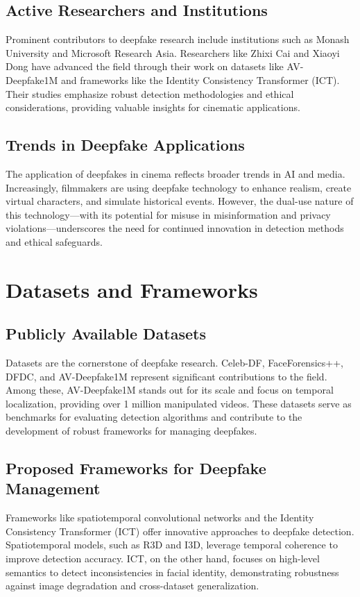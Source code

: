 \documentclass[12pt]{article}
\begin{document}
\subsection{Active Researchers and Institutions}
Prominent contributors to deepfake research include institutions such as Monash University and Microsoft Research Asia. Researchers like Zhixi Cai and Xiaoyi Dong have advanced the field through their work on datasets like AV-Deepfake1M and frameworks like the Identity Consistency Transformer (ICT). Their studies emphasize robust detection methodologies and ethical considerations, providing valuable insights for cinematic applications.

\subsection{Trends in Deepfake Applications}
The application of deepfakes in cinema reflects broader trends in AI and media. Increasingly, filmmakers are using deepfake technology to enhance realism, create virtual characters, and simulate historical events. However, the dual-use nature of this technology—with its potential for misuse in misinformation and privacy violations—underscores the need for continued innovation in detection methods and ethical safeguards.

\section{Datasets and Frameworks}
\subsection{Publicly Available Datasets}
Datasets are the cornerstone of deepfake research. Celeb-DF, FaceForensics++, DFDC, and AV-Deepfake1M represent significant contributions to the field. Among these, AV-Deepfake1M stands out for its scale and focus on temporal localization, providing over 1 million manipulated videos. These datasets serve as benchmarks for evaluating detection algorithms and contribute to the development of robust frameworks for managing deepfakes.

\subsection{Proposed Frameworks for Deepfake Management}
Frameworks like spatiotemporal convolutional networks and the Identity Consistency Transformer (ICT) offer innovative approaches to deepfake detection. Spatiotemporal models, such as R3D and I3D, leverage temporal coherence to improve detection accuracy. ICT, on the other hand, focuses on high-level semantics to detect inconsistencies in facial identity, demonstrating robustness against image degradation and cross-dataset generalization.
\end{document}
